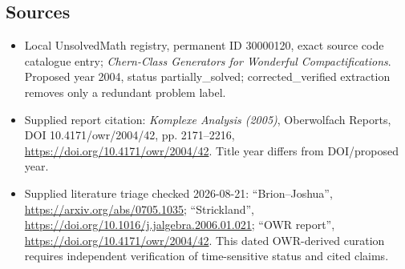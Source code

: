 \documentclass[11pt]{article}
\begin{document}
\subsection{Sources}
\begin{itemize}
\item Local UnsolvedMath registry, permanent ID 30000120, exact source code catalogue entry; \emph{Chern-Class Generators for Wonderful Compactifications}. Proposed year 2004, status partially\_solved; corrected\_verified extraction removes only a redundant problem label.
\item Supplied report citation: \emph{Komplexe Analysis (2005)}, Oberwolfach Reports, DOI 10.4171/owr/2004/42, pp. 2171--2216, \url{https://doi.org/10.4171/owr/2004/42}. Title year differs from DOI/proposed year.
\item Supplied literature triage checked 2026-08-21: ``Brion--Joshua'', \url{https://arxiv.org/abs/0705.1035}; ``Strickland'', \url{https://doi.org/10.1016/j.jalgebra.2006.01.021}; ``OWR report'', \url{https://doi.org/10.4171/owr/2004/42}. This dated OWR-derived curation requires independent verification of time-sensitive status and cited claims.
\end{itemize}
\end{document}
